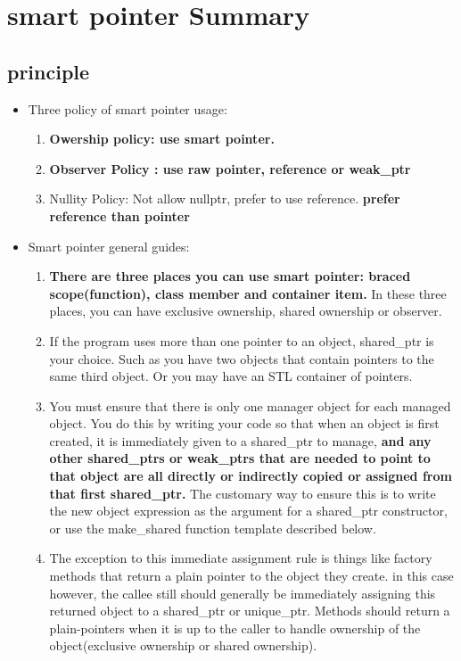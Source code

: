 \documentclass[a4paper,11pt,twoside]{book}
\begin{document}
\section{smart pointer Summary}

\subsection{principle}

\begin{itemize}
\item Three policy of smart pointer usage:
\begin{enumerate}
	\item \textbf{Owership policy: use smart pointer.}
	\item \textbf{Observer Policy : use raw pointer, reference or weak\_ptr}
	\item Nullity Policy: Not allow nullptr, prefer to use reference. \textbf{prefer reference than pointer}
\end{enumerate}

\item Smart pointer general guides:
\begin{enumerate}
\item \textbf{There are three places you can use smart pointer: braced scope(function), class member and container item.} In these three places, you can have exclusive ownership, shared ownership or observer.

\item If the program uses more than one pointer to an object, shared\_ptr is your choice.  Such as you have two objects that contain pointers to the same third object. Or you may have an STL container of pointers.

\item You must ensure that there is only one manager object for each managed object. You do this by writing your code so that when an object is first created, it is immediately given to a shared\_ptr to manage, \textbf{and any other shared\_ptrs or weak\_ptrs that are needed to point to that object are all directly or indirectly copied or assigned from that first shared\_ptr.} The customary way to ensure this is to write the new object expression as the argument for a shared\_ptr constructor, or use the make\_shared function template described below.

\item The exception to this immediate assignment rule is things like factory methods that return a plain pointer to the object they create. in this case however, the callee still should generally be immediately assigning this returned object to a shared\_ptr or unique\_ptr.  Methods should return a plain-pointers when it is up to the caller to handle ownership of the object(exclusive ownership or shared ownership).


\end{enumerate}
\end{itemize}
\end{document}
